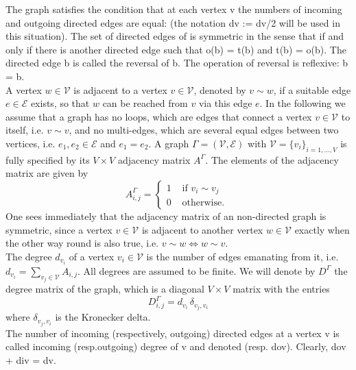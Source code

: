 The graph  satisfies the condition that at each vertex  v the numbers of incoming and outgoing directed edges are equal: (the notation dv := dv/2 will be used in this situation). The set of directed edges of  is symmetric in the sense that  if and only if there is another directed edge such that o(b) = t(b) and t(b) = o(b). The directed edge b is called the reversal of b. The operation of reversal is reflexive: b = b.
\\
A vertex $w \in \mathcal{V}$ is adjacent to a vertex $v \in \mathcal{V}$, denoted by $v \sim w$, if a suitable edge $e \in \mathcal{E}$ exists, so that $w$ can be reached from $v$ via this edge $e$. In the following we assume that a graph has no loops, which are edges that connect a vertex $v \in \mathcal{V}$ to itself, i.e. $v \sim v$, and no multi-edges, which are several equal edges between two vertices, i.e. $e_1, e_2 \in \mathcal{E}$ and $e_1 = e_2$. A graph $\Gamma = (\mathcal{V}, \mathcal{E})$ with $\mathcal{V} = \{v_i\}_{i = 1, \ldots, V}$ is fully specified by its $V \times V$ adjacency matrix $A^{\Gamma}$. The elements of the adjacency matrix are given by
\begin{equation}
    \label{adjacency matrix}
    A^{\Gamma}_{i, j}= \begin{cases} 1 & \text { if } v_i \sim v_j \\ 0 & \text { otherwise. } \end{cases}
\end{equation}
One sees immediately that the adjacency matrix of an non-directed graph is symmetric, since a vertex $v \in \mathcal{V}$ is adjacent to another vertex $w \in \mathcal{V}$ exactly when the other way round is also true, i.e. $v \sim w \Leftrightarrow w \sim v$. \\
The degree $d_{v_i}$ of a vertex $v_i \in \mathcal{V}$ is the number of edges emanating from it, i.e. $d_{v_i} = \sum_{v_j \in \mathcal{V}} A_{i, j}$. All degrees are assumed to be finite. We will denote by $D^{\Gamma}$ the degree matrix of the graph, which is a diagonal $V \times V$ matrix with the entries
\begin{equation}
    \label{degree matrix}
    D^{\Gamma}_{i, j} = d_{v_i} \, \delta_{v_j, v_i}
\end{equation}
where $\delta_{v_j, v_i}$ is the Kronecker delta. \\

The number of incoming (respectively, outgoing) directed edges at a vertex v is called incoming (resp.outgoing) degree of v and denoted  (resp. dov). Clearly, dov + div = dv.

